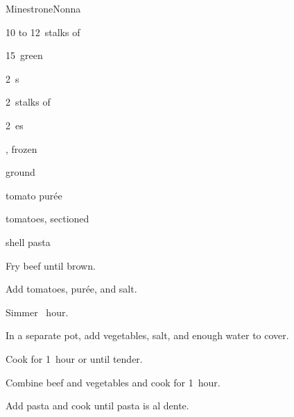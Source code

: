 \begin{recipe}{Minestrone}{Nonna}{}

\begin{ingredients}
\item 10 to 12~stalks of 
\item 15~green 
\item 2~s
\item 2~stalks of 
\item 2~es
\item {} , frozen
\item \lbs{\half} ground 
\item {} tomato pur\'ee
\item tomatoes, sectioned
\item shell pasta
\end{ingredients}

\begin{directions}
\item Fry beef until brown.
\item Add tomatoes, pur\'ee, and salt.
\item Simmer \half~hour.
\item In a separate pot, add vegetables, salt, and enough water to cover.
\item Cook for 1~hour or until tender. 
\item Combine beef and vegetables and cook for 1~hour.
\item Add pasta and cook until pasta is al dente.
\end{directions}

\end{recipe}
